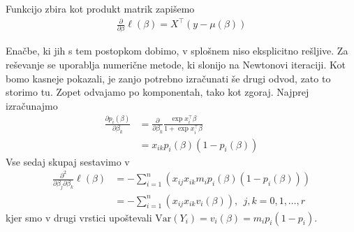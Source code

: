 \documentclass[12pt,a4paper]{amsart}
\theoremstyle{definition} %
\theoremstyle{plain} %
\begin{document}
Funkcijo zbira kot produkt matrik zapišemo
\begin{align}\label{prvi}
    \frac{\partial}{\partial \beta}\ell(\beta) = X^\top(y - \mu(\beta))
\end{align}

Enačbe, ki jih s tem postopkom dobimo, v splošnem niso eksplicitno rešljive. Za reševanje se uporablja numerične metode, ki slonijo na Newtonovi iteraciji. Kot
bomo kasneje pokazali, je zanjo potrebno izračunati še drugi odvod, zato to storimo tu. Zopet odvajamo po komponentah, tako kot zgoraj. Najprej izračunajmo
\begin{align}
    \frac{\partial p_{i}(\beta)}{\partial \beta_{k}} &= \frac{\partial}{\partial \beta_{k}} \frac{\exp{x_{i}^\top\beta}}{1+\exp{x_{i}^\top\beta}} \nonumber \\
        &= x_{ik}p_{i}(\beta)(1 - p_{i}(\beta)) \nonumber
\end{align}
Vse sedaj skupaj sestavimo v
\begin{align}
    \frac{\partial^2}{\partial \beta_{j}\partial\beta_{k}} \ell(\beta) &= - \sum_{i=1}^{n}\left(x_{ij}x_{ik}m_{i}p_{i}(\beta)(1-p_{i}(\beta))\right) \\
    &= -\sum_{i=1}^{n}\left(x_{ij}x_{ik}v_{i}(\beta)\right),~~j,k = 0,1,\ldots, r
\end{align}
kjer smo v drugi vrstici upoštevali  $\mathrm{Var}(Y_{i}) = v_{i}(\beta) = m_{i}p_{i}(1-p_{i}).$
\end{document}
